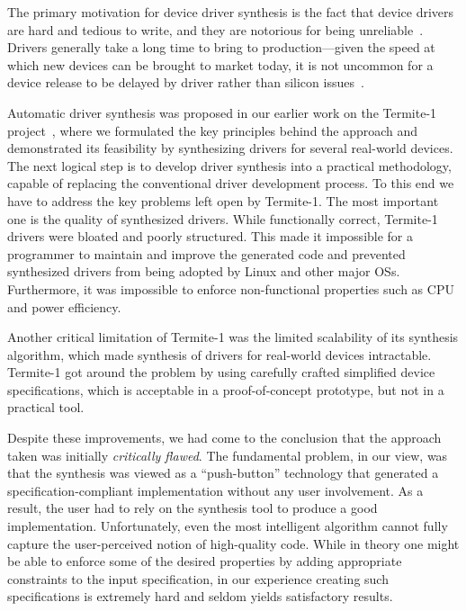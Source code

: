 \documentclass[a4paper,twoside,openright,11pt]{book}
\theoremstyle{definition}
\begin{document}
The primary motivation for device driver synthesis is the fact that device drivers are hard and tedious to write, and they are notorious for being unreliable~\cite{Chou_YCHE_01,Ganapathi_GP_06}. Drivers generally take a long time to bring to production---given the speed at which new devices can be brought to market today, it is not uncommon for a device release to be delayed by driver rather than silicon issues~\cite{Yavatkar_12}. 

Automatic driver synthesis was proposed in our earlier work on the Termite-1 project~\cite{Ryzhyk_CKSH_09}, where we formulated the key principles behind the approach and demonstrated its feasibility by synthesizing drivers for several real-world devices.  The next logical step is to develop driver synthesis into a practical methodology, capable of replacing the conventional driver development process.  To this end we have to address the key problems left open by Termite-1.  The most important one is the quality of synthesized drivers.  While functionally correct, Termite-1 drivers were bloated and poorly structured.  This made it impossible for a programmer to maintain 
and improve the generated code and prevented synthesized drivers from being adopted by Linux and other major OSs.  Furthermore, it was impossible to enforce non-functional properties such as CPU and power efficiency.

Another critical limitation of Termite-1 was the limited scalability of its synthesis algorithm, which made synthesis of drivers for real-world devices intractable. Termite-1 got around the problem by using carefully crafted simplified device specifications, which is acceptable in a proof-of-concept prototype, but not in a practical tool.

Despite these improvements, we had come to the conclusion that the approach taken was initially \emph{critically flawed}.  The fundamental problem, in our view, was that the synthesis was viewed as a ``push-button'' technology that generated a specification-compliant implementation without any user involvement.  As a result, the user had to rely on the synthesis tool to produce a good implementation.  Unfortunately, even the most intelligent algorithm cannot fully capture the user-perceived notion of high-quality code.  While in theory one might be able to enforce some of the desired properties by adding appropriate constraints to the input specification, in our experience creating such specifications is extremely hard and seldom yields satisfactory results.
\end{document}
